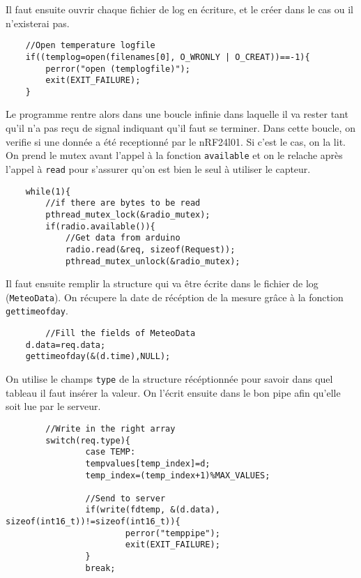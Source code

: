Il faut ensuite ouvrir chaque fichier de log en écriture, et le créer dans le 
cas ou il n'existerai pas. \\

\begin{DDbox}{\linewidth}
\begin{lstlisting}
	//Open temperature logfile
	if((templog=open(filenames[0], O_WRONLY | O_CREAT))==-1){
		perror("open (templogfile)");
		exit(EXIT_FAILURE);
	}
\end{lstlisting}
\end{DDbox}

Le programme rentre alors dans une boucle infinie dans laquelle il va rester
tant qu'il n'a pas reçu de signal indiquant qu'il faut se terminer. Dans cette
boucle, on verifie si une donnée a été receptionné par le nRF24l01. Si c'est le
cas, on la lit. On prend le mutex avant l'appel à la fonction \texttt{available}
et on le relache après l'appel à \texttt{read} pour s'assurer qu'on est bien le
seul à utiliser le capteur. \\

\begin{DDbox}{\linewidth}
\begin{lstlisting}
	while(1){
		//if there are bytes to be read
		pthread_mutex_lock(&radio_mutex);
		if(radio.available()){
			//Get data from arduino
			radio.read(&req, sizeof(Request));
			pthread_mutex_unlock(&radio_mutex);
\end{lstlisting}
\end{DDbox}

Il faut ensuite remplir la structure qui va être écrite dans le fichier de log
(\texttt{MeteoData}). On récupere la date de récéption de la mesure grâce à la
fonction \texttt{gettimeofday}. \\

\begin{DDbox}{\linewidth}
\begin{lstlisting}
        //Fill the fields of MeteoData
	d.data=req.data;
	gettimeofday(&(d.time),NULL);
\end{lstlisting}
\end{DDbox}

On utilise le champs \texttt{type} de la structure récéptionnée pour savoir dans
quel tableau il faut insérer la valeur. On l'écrit ensuite dans le bon pipe 
afin qu'elle soit lue par le serveur. \\

\begin{DDbox}{\linewidth}
\begin{lstlisting}
        //Write in the right array
        switch(req.type){
                case TEMP:
                tempvalues[temp_index]=d;
                temp_index=(temp_index+1)%MAX_VALUES;
          
                //Send to server
                if(write(fdtemp, &(d.data), sizeof(int16_t))!=sizeof(int16_t)){
                        perror("temppipe");
                        exit(EXIT_FAILURE);
                }
                break;
\end{lstlisting}
\end{DDbox}

